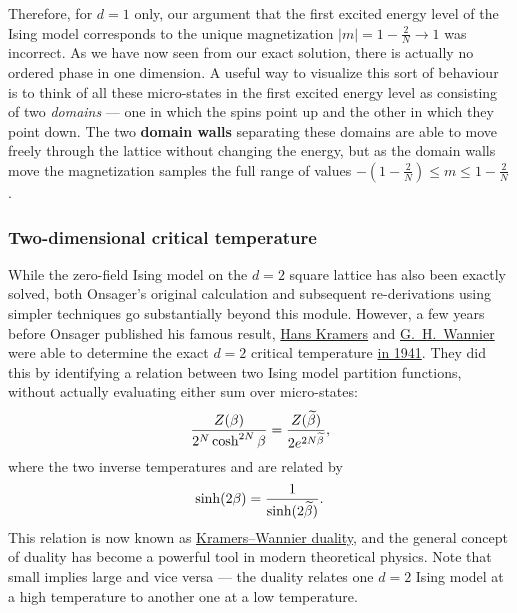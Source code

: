 Therefore, for $d = 1$ only, our argument that the first excited energy level of the Ising model corresponds to the unique magnetization $|m| = 1 - \frac{2}{N} \to 1$ was incorrect.
As we have now seen from our exact solution, there is actually no ordered phase in one dimension. %
A useful way to visualize this sort of behaviour is to think of all these micro-states in the first excited energy level as consisting of two \textit{domains} --- one in which the spins point up and the other in which they point down.
The two \textbf{domain walls} separating these domains are able to move freely through the lattice without changing the energy, but as the domain walls move the magnetization samples the full range of values $-\left(1 - \frac{2}{N}\right) \leq m \leq 1 - \frac{2}{N}$.

\subsubsection{Two-dimensional critical temperature}
While the zero-field Ising model on the $d = 2$ square lattice has also been exactly solved, both Onsager's original calculation and subsequent re-derivations using simpler techniques go substantially beyond this module.
However, a few years before Onsager published his famous result, \href{https://en.wikipedia.org/wiki/Hans_Kramers}{Hans Kramers} and \href{https://en.wikipedia.org/wiki/Gregory_Wannier}{G.~H.~Wannier} were able to determine the exact $d = 2$ critical temperature \href{https://doi.org/10.1103/PhysRev.60.252}{in 1941}.
They did this by identifying a relation between two Ising model partition functions, without actually evaluating either sum over micro-states:
\begin{equation}
  \label{eq:dual_Z}
  \frac{Z(\beta)}{2^N \cosh^{2N} \beta} = \frac{Z(\widetilde{\beta})}{2e^{2N\widetilde{\beta}}},
\end{equation}
where the two inverse temperatures \be and \betw are related by
\begin{equation}
  \label{eq:dual_beta}
  \sinh(2\beta) = \frac{1}{\sinh(2\widetilde{\beta})}.
\end{equation}
This relation is now known as \href{https://en.wikipedia.org/wiki/Kramers-Wannier_duality}{Kramers--Wannier duality}, and the general concept of duality has become a powerful tool in modern theoretical physics.
Note that small \be implies large \betw and vice versa --- the duality relates one $d = 2$ Ising model at a high temperature to another one at a low temperature.

